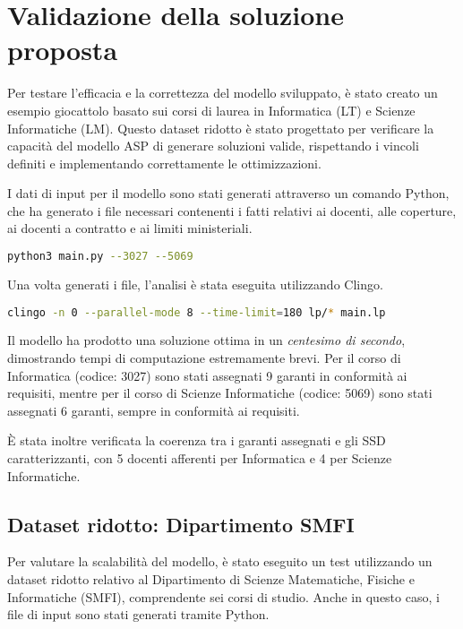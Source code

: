 \section{Validazione della soluzione proposta}
\label{sec:expval}

Per testare l'efficacia e la correttezza del modello sviluppato, è stato creato un esempio 
giocattolo basato sui corsi di laurea in Informatica (LT) e Scienze Informatiche (LM). 
Questo dataset ridotto è stato progettato per verificare la capacità del modello ASP di 
generare soluzioni valide, rispettando i vincoli definiti e implementando correttamente 
le ottimizzazioni.

I dati di input per il modello sono stati generati attraverso un comando Python, che ha 
generato i file necessari contenenti i fatti relativi ai docenti, alle coperture, ai 
docenti a contratto e ai limiti ministeriali.

\begin{lstlisting}[language=bash]
 python3 main.py --3027 --5069
\end{lstlisting}

Una volta generati i file, l'analisi è stata eseguita utilizzando Clingo.

\begin{lstlisting}[language=bash]
 clingo -n 0 --parallel-mode 8 --time-limit=180 lp/* main.lp
\end{lstlisting}

Il modello ha prodotto una soluzione ottima in un \textit{centesimo di secondo}, 
dimostrando tempi di computazione estremamente brevi. Per il corso di Informatica 
(codice: 3027) sono stati assegnati 9 garanti in conformità ai requisiti, mentre per il corso di 
Scienze Informatiche (codice: 5069) sono stati assegnati 6 garanti, sempre in conformità ai 
requisiti.

È stata inoltre verificata la coerenza tra i garanti assegnati e gli SSD caratterizzanti, 
con 5 docenti afferenti per Informatica e 4 per Scienze Informatiche.

\subsection{Dataset ridotto: Dipartimento SMFI}
\label{sec:-dataset-dipartimento-smfi}

Per valutare la scalabilità del modello, è stato eseguito un test utilizzando un dataset 
ridotto relativo al Dipartimento di Scienze Matematiche, Fisiche e Informatiche (SMFI), 
comprendente sei corsi di studio. Anche in questo caso, i file di input sono stati generati 
tramite Python.

